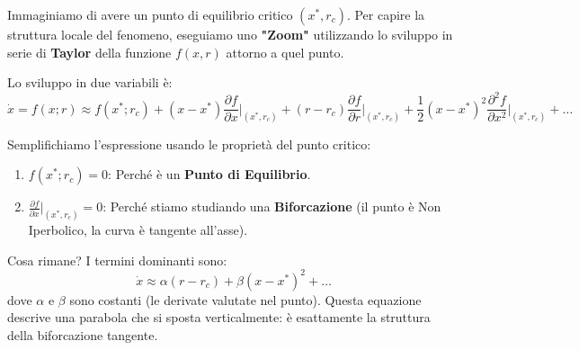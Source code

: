 \documentclass[openany]{book}
\theoremstyle{definition}
\theoremstyle{remark}
\begin{document}
\begin{center}
\end{center}

Immaginiamo di avere un punto di equilibrio critico $(x^*, r_c)$. Per capire la struttura locale del fenomeno, eseguiamo uno \textbf{"Zoom"} utilizzando lo sviluppo in serie di \textbf{Taylor} della funzione $f(x,r)$ attorno a quel punto.

Lo sviluppo in due variabili è:
\[ \dot{x} = f(x; r) \approx f(x^*; r_c) + (x-x^*) \frac{\partial f}{\partial x}\bigg|_{(x^*, r_c)} + (r-r_c)\frac{\partial f}{\partial r}\bigg|_{(x^*, r_c)} + \frac{1}{2}(x-x^*)^2 \frac{\partial^2 f}{\partial x^2}\bigg|_{(x^*, r_c)} + \dots \]

Semplifichiamo l'espressione usando le proprietà del punto critico:
\begin{enumerate}
    \item $f(x^*; r_c) = 0$: Perché è un \textbf{Punto di Equilibrio}.
    \item $\displaystyle \frac{\partial f}{\partial x}\bigg|_{(x^*, r_c)} = 0$: Perché stiamo studiando una \textbf{Biforcazione} (il punto è Non Iperbolico, la curva è tangente all'asse).
\end{enumerate}

Cosa rimane? I termini dominanti sono:
\begin{equation}
    \dot{x} \approx \alpha (r - r_c) + \beta (x - x^*)^2 + \dots
\end{equation}
dove $\alpha$ e $\beta$ sono costanti (le derivate valutate nel punto). Questa equazione descrive una parabola che si sposta verticalmente: è esattamente la struttura della biforcazione tangente.
\end{document}
